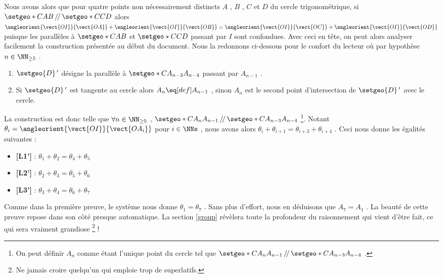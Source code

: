 \vspace{1em}


Nous avons alors que pour quatre points non nécessairement distincts $A$ , $B$ , $C$ et $D$ du cercle trigonométrique, si $\setgeo*{C}{AB} \,/\!/\,\setgeo*{C}{CD}$ alors
$\angleorient{\vect{OI}}{\vect{OA}} + \angleorient{\vect{OI}}{\vect{OB}} 
=
 \angleorient{\vect{OI}}{\vect{OC}} + \angleorient{\vect{OI}}{\vect{OD}}$ 
puisque les parallèles à $\setgeo*{C}{AB}$ et $\setgeo*{C}{CD}$ passant par $I$ sont confondues.
Avec ceci en tête, on peut alors analyser facilement la construction présentée au début du document.
Nous la redonnons ci-dessous pour le confort du lecteur où par hypothèse $n \in \NN_{\geq 5}$ .

\begin{enumerate}
	\item $\setgeo{D}\,'$ désigne la parallèle à $\setgeo*{C}{A_{n-3} A_{n-4}}$ passant par $A_{n-1}$ .

	\item Si $\setgeo{D}\,'$ est tangente au cercle alors $A_n \eq[def] A_{n-1}$ , sinon $A_n$ est le second point d'intersection de $\setgeo{D}\,'$ avec le cercle.
\end{enumerate}


\medskip

La construction est donc telle que $\forall n \in \NN_{\geq 5}$ , 
$\setgeo*{C}{A_{n} A_{n-1}} \,/\!/\, \setgeo*{C}{A_{n-3} A_{n-4}}$ 
\footnote{
	On peut définir $A_{n}$ comme étant l'unique point du cercle tel que $\setgeo*{C}{A_{n} A_{n-1}} \,/\!/\, \setgeo*{C}{A_{n-3} A_{n-4}}$  .
}.
Notant $\theta_i = \angleorient{\vect{OI}}{\vect{OA_i}}$ pour $i \in \NNs$ , nous avons alors
$\theta_i + \theta_{i+1} = \theta_{i+3} + \theta_{i+4}$ . Ceci nous donne les égalités suivantes :
\begin{itemize}[label=\small\textbullet]
	\item \textbf{[L1']} : 
	      $\theta_1 + \theta_{2} = \theta_{4} + \theta_{5}$

	\item \textbf{[L2']} : 
	      $\theta_2 + \theta_{3} = \theta_{5} + \theta_{6}$

	\item \textbf{[L3']} : 
	      $\theta_3 + \theta_{4} = \theta_{6} + \theta_{7}$
\end{itemize}


\medskip

Comme dans la première preuve, le système nous donne $\theta_1 = \theta_7$ . Sans plus d'effort, nous en déduisons que $A_7 = A_1$ . La beauté de cette preuve repose dans son côté presque automatique. La section \ref{group} révèlera toute la profondeur du raisonnement qui vient d'être fait, ce qui sera vraiment grandiose
\footnote{
	Ne jamais croire quelqu'un qui emploie trop de superlatifs.
} !
